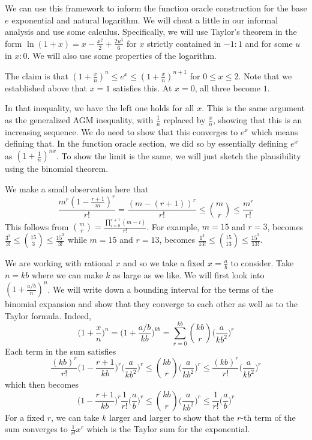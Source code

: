 \documentclass[12pt]{article}
\begin{document}
We can use this framework to inform the function oracle construction for the base $e$ exponential and natural logarithm. We will cheat a little in our informal analysis and use some calculus. Specifically, we will use Taylor's theorem in the form $\ln(1+x) = x - \frac{x^2}{2} + \frac{2u^3}{6}$ for $x$ strictly contained in $-1:1$ and for some $u$ in $x:0$. We will also use some properties of the logarithm. 

The claim is that $(1+\frac{x}{n})^n \leq e^x \leq (1+\frac{x}{n})^{n+1}$ for $0 \leq x \leq 2$. Note that we established above that $x=1$ satisfies this. At $x=0$, all three become $1$. 

In that inequality, we have the left one holds for all $x$. This is the same argument as the generalized AGM inequality, with $\frac{1}{n}$ replaced by $\frac{x}{n}$, showing that this is an increasing sequence. We do need to show that this converges to $e^x$ which means defining that. In the function oracle section, we did so by essentially defining $e^x$ as $(1+\frac{1}{n})^{nx}$. To show the limit is the same, we will just sketch the plausibility using the binomial theorem. 

We make a small observation here that $$\frac{m^r(1 - \frac{r+1}{m})^r}{r!} = \frac{(m - (r+1))^r}{r!} \leq \binom{m}{r} \leq \frac{m^r}{r!}$$ This follows from $\binom{m}{r} = \frac{\prod_{i=0}^{r+1} (m-i)}{r!}$. For example, $m=15$ and $r=3$, becomes $\frac{3^3}{3!} \leq \binom{15}{3} \leq \frac{15^3}{3!}$ while $m=15$ and $r=13$, becomes $\frac{1^3}{13!} \leq \binom{15}{13} \leq \frac{15^3}{13!}$. 

We are working with rational $x$ and so we take a fixed $x=\frac{a}{b}$ to consider. Take $n = kb$ where we can make $k$ as large as we like. We will first look into $(1+ \frac{a/b}{n})^n$. We will write down a bounding interval for the terms of the binomial expansion and show that they converge to each other as well as to the Taylor formula. Indeed, 
$$\bigg(1+\frac{x}{n}\bigg)^n = \bigg(1+ \frac{a/b}{kb}\bigg)^{kb} = \sum_{r=0}^{kb} \binom{kb}{r} \bigg(\frac{a}{kb^2}\bigg)^r$$
Each term in the sum satisfies 
$$\frac{(kb)^r}{r!} \bigg( 1 - \frac{r+1}{kb}\bigg)^r \bigg(\frac{a}{kb^2}\bigg)^r \leq \binom{kb}{r} \bigg(\frac{a}{kb^2}\bigg)^r \leq \frac{(kb)^r}{r!} \bigg(\frac{a}{kb^2}\bigg)^r$$ 
which then becomes
$$\bigg( 1 - \frac{r+1}{kb}\bigg)^r \frac{1}{r!} \bigg(\frac{a}{b}\bigg)^r \leq \binom{kb}{r} \bigg(\frac{a}{kb^2}\bigg)^r \leq \frac{1}{r!}\bigg(\frac{a}{b}\bigg)^r$$ 
For a fixed $r$, we can take $k$ larger and larger to show that the $r$-th term of the sum converges to $\frac{1}{r!}x^r$ which is the Taylor sum for the exponential. 
\end{document}
